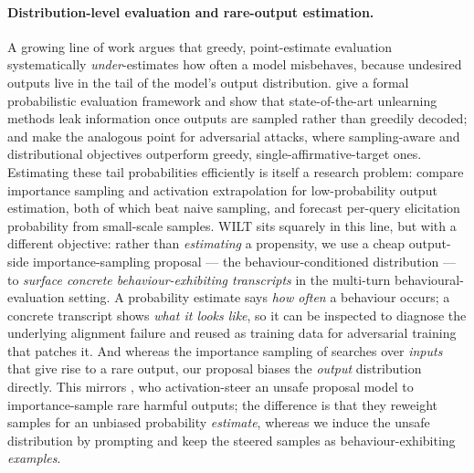 \documentclass{article}
\theoremstyle{plain}
\theoremstyle{definition}
\theoremstyle{remark}
\begin{document}
\paragraph{Distribution-level evaluation and rare-output estimation.}
A growing line of work argues that greedy, point-estimate evaluation systematically \emph{under}-estimates how often a model misbehaves, because undesired outputs live in the tail of the model's output distribution.
\citet{scholten2024probabilistic} give a formal probabilistic evaluation framework and show that state-of-the-art unlearning methods leak information once outputs are sampled rather than greedily decoded; \citet{beyer2026sampling} and \citet{geisler2025reinforce} make the analogous point for adversarial attacks, where sampling-aware and distributional objectives outperform greedy, single-affirmative-target ones.
Estimating these tail probabilities efficiently is itself a research problem: \citet{wu2024rare} compare importance sampling and activation extrapolation for low-probability output estimation, both of which beat naive sampling, and \citet{jones2025forecasting} forecast per-query elicitation probability from small-scale samples.
WILT sits squarely in this line, but with a different objective: rather than \emph{estimating} a propensity, we use a cheap output-side importance-sampling proposal --- the behaviour-conditioned distribution --- to \emph{surface concrete behaviour-exhibiting transcripts} in the multi-turn behavioural-evaluation setting.
A probability estimate says \emph{how often} a behaviour occurs; a concrete transcript shows \emph{what it looks like}, so it can be inspected to diagnose the underlying alignment failure and reused as training data for adversarial training that patches it.
And whereas the importance sampling of \citet{wu2024rare} searches over \emph{inputs} that give rise to a rare output, our proposal biases the \emph{output} distribution directly.
This mirrors \citet{angell2026tail}, who activation-steer an unsafe proposal model to importance-sample rare harmful outputs; the difference is that they reweight samples for an unbiased probability \emph{estimate}, whereas we induce the unsafe distribution by prompting and keep the steered samples as behaviour-exhibiting \emph{examples}.
\end{document}
